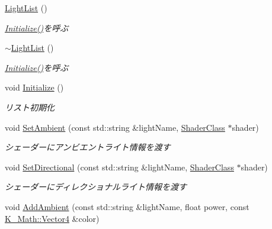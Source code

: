\begin{DoxyCompactItemize}
\item 
\mbox{\hyperlink{class_k___graphics_1_1_light_list_a9a93f06156dd12df543b69b5bf0e37b5}{Light\+List}} ()
\begin{DoxyCompactList}\small\item\em \mbox{\hyperlink{class_k___graphics_1_1_light_list_a00bcfff4cd52816b2eb31b8a55c6e1b3}{Initialize()}}を呼ぶ \end{DoxyCompactList}\item 
\mbox{\hyperlink{class_k___graphics_1_1_light_list_af8d54a762741383c985ca62175b11b55}{$\sim$\+Light\+List}} ()
\begin{DoxyCompactList}\small\item\em \mbox{\hyperlink{class_k___graphics_1_1_light_list_a00bcfff4cd52816b2eb31b8a55c6e1b3}{Initialize()}}を呼ぶ \end{DoxyCompactList}\item 
void \mbox{\hyperlink{class_k___graphics_1_1_light_list_a00bcfff4cd52816b2eb31b8a55c6e1b3}{Initialize}} ()
\begin{DoxyCompactList}\small\item\em リスト初期化 \end{DoxyCompactList}\item 
void \mbox{\hyperlink{class_k___graphics_1_1_light_list_a92da95153193c3e43e58c875555288c5}{Set\+Ambient}} (const std\+::string \&light\+Name, \mbox{\hyperlink{class_k___graphics_1_1_shader_class}{Shader\+Class}} $\ast$shader)
\begin{DoxyCompactList}\small\item\em シェーダーにアンビエントライト情報を渡す \end{DoxyCompactList}\item 
void \mbox{\hyperlink{class_k___graphics_1_1_light_list_ab4aee7280e8658fefd8fca3fef66e4c0}{Set\+Directional}} (const std\+::string \&light\+Name, \mbox{\hyperlink{class_k___graphics_1_1_shader_class}{Shader\+Class}} $\ast$shader)
\begin{DoxyCompactList}\small\item\em シェーダーにディレクショナルライト情報を渡す \end{DoxyCompactList}\item 
void \mbox{\hyperlink{class_k___graphics_1_1_light_list_a940f2dc8a56fb93f5020804a3c3cc53f}{Add\+Ambient}} (const std\+::string \&light\+Name, float power, const \mbox{\hyperlink{namespace_k___math_a8d82de9de17eae460600de1e40e8a01f}{K\+\_\+\+Math\+::\+Vector4}} \&color)

\end{DoxyCompactItemize}
